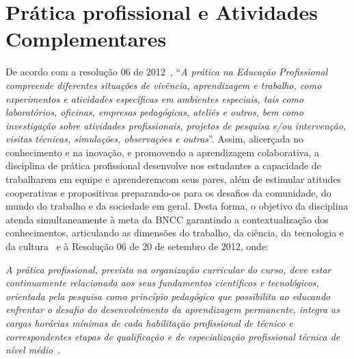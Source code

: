 \documentclass[11pt,fleqn]{book} %
\renewenvironment{quote}
{\small\list{}{\rightmargin=.1cm \leftmargin=2.5cm}%
	\item\relax}
{\endlist}
\begin{document}
\newpage
\section{Prática profissional e Atividades Complementares}\label{ementasEstudo}
\indent

De acordo com a resolução 06 de 2012~\cite{Resolucao06De2012}, ``\textit{A prática na Educação Profissional compreende diferentes situações de vivência, aprendizagem e trabalho, como experimentos e atividades específicas em ambientes especiais, tais como laboratórios, oficinas, empresas pedagógicas, ateliês e outros, bem como investigação sobre atividades profissionais, projetos de pesquisa e/ou intervenção, visitas técnicas, simulações, observações e outras}''.
Assim, alicerçada no conhecimento e na inovação, e promovendo a aprendizagem colaborativa, a disciplina de prática profissional desenvolve nos estudantes a capacidade de trabalharem em equipe e aprenderemcom seus pares, além de estimular atitudes cooperativas e propositivas preparando-os para os desafios da comunidade, do mundo do trabalho e da sociedade em geral.
Desta forma, o objetivo da disciplina atenda simultaneamente à meta da BNCC garantindo a contextualização dos conhecimentos, articulando as dimensões do trabalho, da ciência, da tecnologia e da cultura~\cite{BNCC2019} e à Resolução 06 de 20 de setembro de 2012, onde:
\begin{quote}
	\textit{A prática profissional, prevista na organização curricular do curso, deve estar continuamente relacionada aos seus fundamentos científicos e tecnológicos, orientada pela pesquisa como princípio pedagógico que possibilita ao educando enfrentar o desafio do desenvolvimento da aprendizagem permanente, integra as cargas horárias mínimas de cada habilitação profissional de técnico e correspondentes etapas de qualificação e de especialização profissional técnica de nível médio}~\cite{Resolucao06De2012}.
\end{quote}
\end{document}
